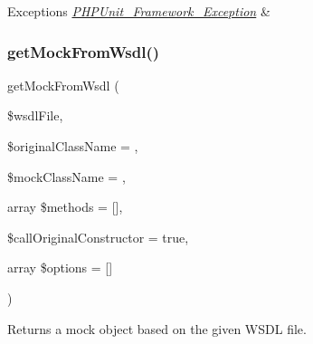 \begin{DoxyExceptions}{Exceptions}
{\em \mbox{\hyperlink{class_p_h_p_unit___framework___exception}{P\+H\+P\+Unit\+\_\+\+Framework\+\_\+\+Exception}}} & \\
\hline
\end{DoxyExceptions}
\mbox{\label{class_p_h_p_unit___framework___test_case_a2e103f3c8271bf3a1dca6b95a38cad5d}} 
\subsubsection{\texorpdfstring{get\+Mock\+From\+Wsdl()}{getMockFromWsdl()}}
{\footnotesize\ttfamily get\+Mock\+From\+Wsdl (\begin{DoxyParamCaption}\item[{}]{\$wsdl\+File,  }\item[{}]{\$original\+Class\+Name = {\ttfamily \textquotesingle{}\textquotesingle{}},  }\item[{}]{\$mock\+Class\+Name = {\ttfamily \textquotesingle{}\textquotesingle{}},  }\item[{array}]{\$methods = {\ttfamily \mbox{[}\mbox{]}},  }\item[{}]{\$call\+Original\+Constructor = {\ttfamily true},  }\item[{array}]{\$options = {\ttfamily \mbox{[}\mbox{]}} }\end{DoxyParamCaption})\hspace{0.3cm}{\ttfamily [protected]}}

Returns a mock object based on the given W\+S\+DL file.


